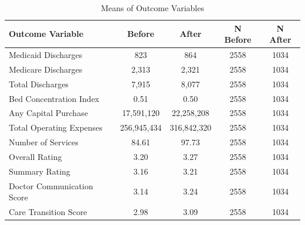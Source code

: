 \begin{table}[ht!]

\caption{Means of Outcome Variables\label{tab:outcome_means}}
\centering
\begin{tabular}[t]{lcccc}
\toprule
Outcome Variable & Before & After & N Before & N After\\
\midrule
Medicaid Discharges & 823 & 864 & 2558 & 1034\\
Medicare Discharges & 2,313 & 2,321 & 2558 & 1034\\
Total Discharges & 7,915 & 8,077 & 2558 & 1034\\
Bed Concentration Index & 0.51 & 0.50 & 2558 & 1034\\
Any Capital Purchase & 17,591,120 & 22,258,208 & 2558 & 1034\\
Total Operating Expenses & 256,945,434 & 316,842,320 & 2558 & 1034\\
Number of Services & 84.61 & 97.73 & 2558 & 1034\\
Overall Rating & 3.20 & 3.27 & 2558 & 1034\\
Summary Rating & 3.16 & 3.21 & 2558 & 1034\\
Doctor Communication Score & 3.14 & 3.24 & 2558 & 1034\\
Care Transition Score & 2.98 & 3.09 & 2558 & 1034\\
\bottomrule
\end{tabular}
\end{table}
